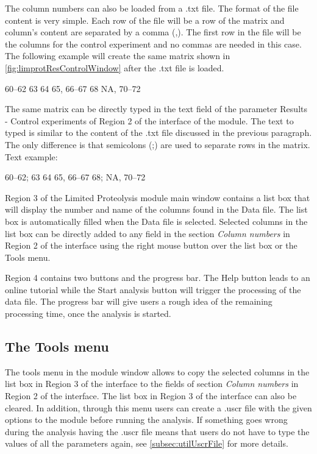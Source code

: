 The column numbers can also be loaded from a .txt file. The format of the file content is very simple. Each row of the file will be a row of the matrix and column's content are separated by a comma (,). The first row in the file will be the columns for the control experiment and no commas are needed in this case. The following example will create the same matrix shown in \autoref{fig:limprotResControlWindow} after the .txt file is loaded.

\numrange[range-phrase=--]{60}{62}\newline
\num{63} \num{64} \num{65}, \numrange[range-phrase=--]{66}{67} \num{68}\newline
NA, \numrange[range-phrase=--]{70}{72} 

The same matrix can be directly typed in the text field of the parameter Results - Control experiments of Region \num{2} of the interface of the module. The text to typed is similar to the content of the .txt file discussed in the previous paragraph. The only difference is that semicolons (;) are used to separate rows in the matrix. Text example:

\numrange[range-phrase=--]{60}{62}; \num{63} \num{64} \num{65}, \numrange[range-phrase=--]{66}{67} \num{68}; NA, \numrange[range-phrase=--]{70}{72}

Region \num{3} of the Limited Proteolysis module main window contains a list box that will display the number and name of the columns found in the Data file. The list box is automatically filled when the Data file is selected. Selected columns in the list box can be directly added to any field in the section \textit{Column numbers} in Region \num{2} of the interface using the right mouse button over the list box or the Tools menu.

Region \num{4} contains two buttons and the progress bar. The Help button leads to an online tutorial while the Start analysis button will trigger the processing of the data file. The progress bar will give users a rough idea of the remaining processing time, once the analysis is started.

\subsection{The Tools menu}

The tools menu in the module window allows to copy the selected columns in the list box in Region \num{3} of the interface to the fields of section \textit{Column numbers} in Region \num{2} of the interface. The list box in Region \num{3} of the interface can also be cleared. In addition, through this menu users can create a .uscr file with the given options to the module before running the analysis. If something goes wrong during the analysis having the .uscr file means that users do not have to type the values of all the parameters again, see \autoref{subsec:utilUscrFile} for more details.   

